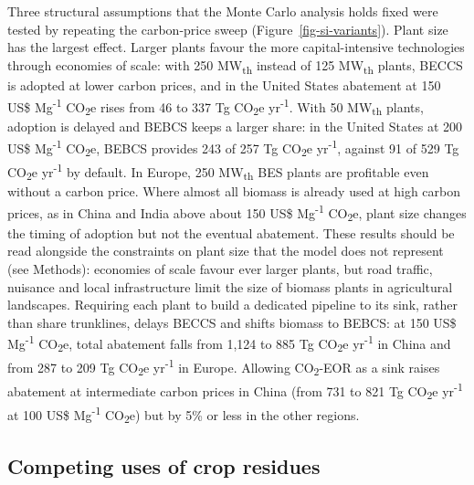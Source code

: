 \documentclass[
  letterpaper,
]{article}
\begin{document}
Three structural assumptions that the Monte Carlo analysis holds fixed
were tested by repeating the carbon-price sweep
(Figure~\ref{fig-si-variants}). Plant size has the largest effect.
Larger plants favour the more capital-intensive technologies through
economies of scale: with 250 MW\textsubscript{th} instead of 125
MW\textsubscript{th} plants, BECCS is adopted at lower carbon prices,
and in the United States abatement at 150 US\$ Mg\textsuperscript{-1}
CO\textsubscript{2}e rises from 46 to 337 Tg CO\textsubscript{2}e
yr\textsuperscript{-1}. With 50 MW\textsubscript{th} plants, adoption is
delayed and BEBCS keeps a larger share: in the United States at 200 US\$
Mg\textsuperscript{-1} CO\textsubscript{2}e, BEBCS provides 243 of 257
Tg CO\textsubscript{2}e yr\textsuperscript{-1}, against 91 of 529 Tg
CO\textsubscript{2}e yr\textsuperscript{-1} by default. In Europe, 250
MW\textsubscript{th} BES plants are profitable even without a carbon
price. Where almost all biomass is already used at high carbon prices,
as in China and India above about 150 US\$ Mg\textsuperscript{-1}
CO\textsubscript{2}e, plant size changes the timing of adoption but not
the eventual abatement. These results should be read alongside the
constraints on plant size that the model does not represent (see
Methods): economies of scale favour ever larger plants, but road
traffic, nuisance and local infrastructure limit the size of biomass
plants in agricultural landscapes. Requiring each plant to build a
dedicated pipeline to its sink, rather than share trunklines, delays
BECCS and shifts biomass to BEBCS: at 150 US\$ Mg\textsuperscript{-1}
CO\textsubscript{2}e, total abatement falls from 1,124 to 885 Tg
CO\textsubscript{2}e yr\textsuperscript{-1} in China and from 287 to 209
Tg CO\textsubscript{2}e yr\textsuperscript{-1} in Europe. Allowing
CO\textsubscript{2}-EOR as a sink raises abatement at intermediate
carbon prices in China (from 731 to 821 Tg CO\textsubscript{2}e
yr\textsuperscript{-1} at 100 US\$ Mg\textsuperscript{-1}
CO\textsubscript{2}e) but by 5\% or less in the other regions.

\subsection{Competing uses of crop
residues}\label{competing-uses-of-crop-residues}
\end{document}
